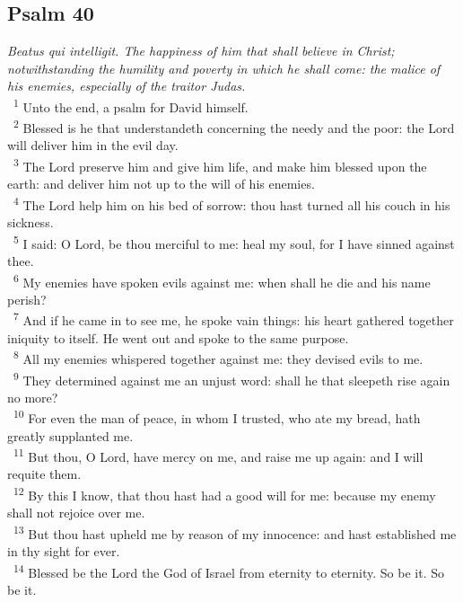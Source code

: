 \documentclass[a5paper,12pt]{article}
\begin{document}
\begin{multicols*}{2}
\section{Psalm 40}
\label{sec:org6bc5c7e}
\emph{Beatus qui intelligit. The happiness of him that shall believe in Christ; notwithstanding the humility and poverty in which he shall come: the malice of his enemies, especially of the traitor Judas.}\\

~\textsuperscript{1} Unto the end, a psalm for David himself.\\
~\textsuperscript{2} Blessed is he that understandeth concerning the needy and the poor: the Lord will deliver him in the evil day.\\
~\textsuperscript{3} The Lord preserve him and give him life, and make him blessed upon the earth: and deliver him not up to the will of his enemies.\\
~\textsuperscript{4} The Lord help him on his bed of sorrow: thou hast turned all his couch in his sickness.\\
~\textsuperscript{5} I said: O Lord, be thou merciful to me: heal my soul, for I have sinned against thee.\\
~\textsuperscript{6} My enemies have spoken evils against me: when shall he die and his name perish?\\
~\textsuperscript{7} And if he came in to see me, he spoke vain things: his heart gathered together iniquity to itself. He went out and spoke to the same purpose.\\
~\textsuperscript{8} All my enemies whispered together against me: they devised evils to me.\\
~\textsuperscript{9} They determined against me an unjust word: shall he that sleepeth rise again no more?\\
~\textsuperscript{10} For even the man of peace, in whom I trusted, who ate my bread, hath greatly supplanted me.\\
~\textsuperscript{11} But thou, O Lord, have mercy on me, and raise me up again: and I will requite them.\\
~\textsuperscript{12} By this I know, that thou hast had a good will for me: because my enemy shall not rejoice over me.\\
~\textsuperscript{13} But thou hast upheld me by reason of my innocence: and hast established me in thy sight for ever.\\
~\textsuperscript{14} Blessed be the Lord the God of Israel from eternity to eternity. So be it. So be it.\\


\end{multicols*}
\end{document}
